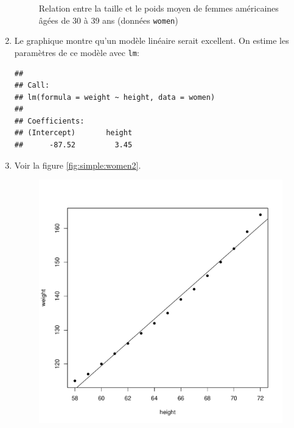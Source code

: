 \begin{solution}{2.3}
\begin{enumerate}
\begin{figure}
\begin{knitrout}
\end{knitrout}
        \caption{Relation entre la taille et le poids moyen de femmes américaines âgées de 30 à 39 ans (données \texttt{women})}
        \label{fig:simple:women}
      \end{figure}
    \item Le graphique montre qu'un modèle linéaire serait
      excellent. On estime les paramètres de ce modèle avec \texttt{lm}:
\begin{knitrout}
\color{fgcolor}\begin{kframe}
\begin{alltt}
 \hlkwb{<-}  \hlopt{~}   
\end{alltt}
\begin{verbatim}
##
## Call:
## lm(formula = weight ~ height, data = women)
##
## Coefficients:
## (Intercept)       height
##      -87.52         3.45
\end{verbatim}
\end{kframe}
\end{knitrout}
    \item Voir la figure \ref{fig:simple:women2}.
      \begin{figure}
        \centering
\begin{knitrout}
\color{fgcolor}\begin{kframe}
\begin{alltt}
\end{alltt}
\end{kframe}
\end{knitrout}
\begin{knitrout}
\color{fgcolor}
\includegraphics[width=\maxwidth]{figure/unnamed-chunk-18-1}


\end{knitrout}
\end{figure}
\end{enumerate}
\end{solution}
